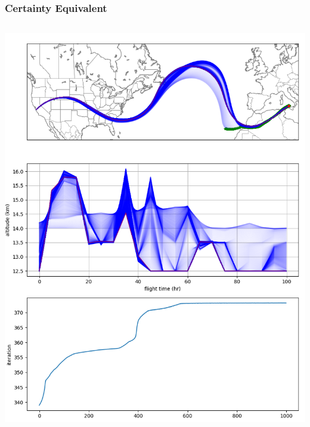 \documentclass[10pt,mathserif]{beamer}
\begin{document}
\begin{frame}
\frametitle{Certainty Equivalent}
\begin{columns}
\includegraphics[width=1\linewidth,trim={0 9.5cm 0 0cm},clip]{certaintyeq.png}

\end{columns}
\end{frame}
\end{document}
